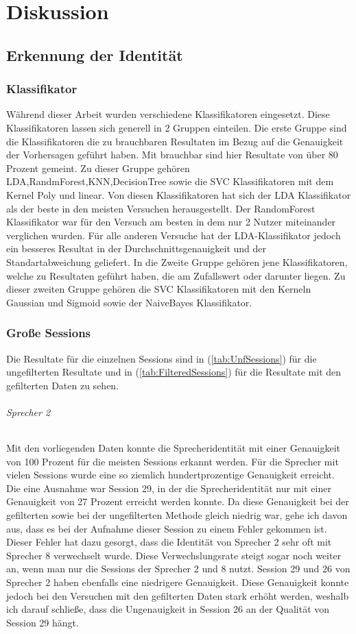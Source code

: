 \chapter{Diskussion}
\section{Erkennung der Identität}
\subsection{Klassifikator}
Während dieser Arbeit wurden verschiedene Klassifikatoren eingesetzt. Diese Klassifikatoren lassen sich generell in 2 Gruppen einteilen. Die erste Gruppe sind die Klassifikatoren die zu brauchbaren Resultaten im Bezug auf die Genauigkeit der Vorhersagen geführt haben. Mit brauchbar sind hier Resultate von über 80 Prozent gemeint. Zu dieser Gruppe gehören LDA,RandmForest,KNN,DecisionTree sowie die SVC Klassifikatoren mit dem Kernel Poly und linear. Von diesen Klassifikatoren hat sich der LDA Klassifikator als der beste in den meisten Versuchen herausgestellt. Der RandomForest Klassifikator war für den Versuch am besten in dem nur 2 Nutzer miteinander verglichen wurden. Für alle anderen Versuche hat der LDA-Klassifikator jedoch ein besseres Resultat in der Durchschnittsgenauigkeit und der Standartabweichung geliefert.
In die Zweite Gruppe gehören jene Klassifikatoren, welche zu Resultaten geführt haben, die am Zufallswert oder darunter liegen. Zu dieser zweiten Gruppe gehören die SVC Klassifikatoren mit den Kerneln Gaussian und Sigmoid sowie der NaiveBayes Klassifikator.

\subsection{Große Sessions}
Die Resultate für die einzelnen Sessions sind in (\ref{tab:UnfSessions}) für die ungefilterten Resultate und in (\ref{tab:FilteredSessions}) für die Resultate mit den gefilterten Daten zu sehen.
\subparagraph{Sprecher 2}
Mit den vorliegenden Daten konnte die Sprecheridentität mit einer Genauigkeit von 100 Prozent für die meisten Sessions erkannt werden. Für die Sprecher mit vielen Sessions wurde eine so ziemlich hundertprozentige Genauigkeit erreicht. Die eine Ausnahme war Session 29, in der die Sprecheridentität nur mit einer Genauigkeit von 27 Prozent erreicht werden konnte. Da diese Genauigkeit bei der gefilterten sowie bei der ungefilterten Methode gleich niedrig war, gehe ich davon aus, dass es bei der Aufnahme dieser Session zu einem Fehler gekommen ist. Dieser Fehler hat dazu gesorgt, dass die Identität von Sprecher 2 sehr oft mit Sprecher 8 verwechselt wurde. Diese Verwechslungsrate steigt sogar noch weiter an, wenn man nur die Sessions der Sprecher 2 und 8 nutzt.
Session 29 und 26 von Sprecher 2 haben ebenfalls eine niedrigere Genauigkeit. Diese Genauigkeit konnte jedoch bei den Versuchen mit den gefilterten Daten stark erhöht werden, weshalb ich darauf schließe, dass die Ungenauigkeit in Session 26 an der Qualität von Session 29 hängt.

